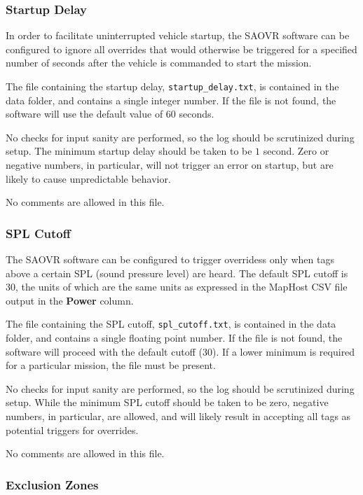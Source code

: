 \documentclass[11pt]{article} %
\begin{document}
\subsubsection*{Startup Delay}
In order to facilitate uninterrupted vehicle startup, the SAOVR software
can be configured to ignore all overrides that would otherwise be triggered for a specified number of seconds after the vehicle is
commanded to start the mission.

The file containing the startup delay, \mbox{\texttt{startup\_delay.txt}},
is contained in the data folder, and contains a single integer number.
If the file is not found, the software will use the default value of
$60$ seconds.

No checks for input sanity are performed, so the log should be
scrutinized during setup. The minimum startup delay should be
taken to be $1$ second. Zero or negative numbers, in particular, will not trigger an error on startup, but are likely to cause unpredictable behavior.

No comments are allowed in this file.


\subsubsection*{SPL Cutoff}
The SAOVR software can be configured to trigger overridess only 
when tags above a 
certain SPL (sound pressure level) are heard. The default SPL cutoff is
30, the units of which are the same units as expressed in the 
MapHost CSV file output in the \textbf{Power} column.

The file containing the SPL cutoff, \mbox{\texttt{spl\_cutoff.txt}}, 
is contained in the data folder, and contains a single floating
point number. If the file is not found, the software
will proceed with the default cutoff ($30$). If a lower minimum is required
for a particular mission, the file must be present.

No checks for input sanity are performed, so the log should be
scrutinized during setup. While the minimum SPL cutoff should be
taken to be zero, negative numbers, in particular, are allowed,
and will likely result in accepting all tags as potential triggers
for overrides.

No comments are allowed in this file.

\subsubsection*{Exclusion Zones}
\end{document}

